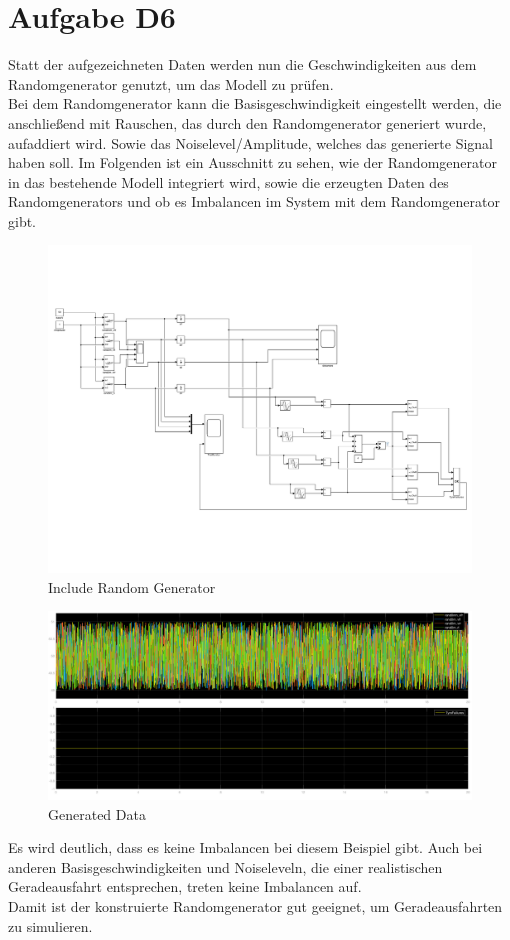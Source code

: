 
\chapter{Aufgabe D6}
Statt der aufgezeichneten Daten werden nun die Geschwindigkeiten aus dem Randomgenerator genutzt, um das Modell zu prüfen. \\
Bei dem Randomgenerator kann die Basisgeschwindigkeit eingestellt werden, die anschließend mit Rauschen, das durch den Randomgenerator generiert wurde, aufaddiert wird. Sowie das Noiselevel/Amplitude, welches das generierte Signal haben soll. Im Folgenden ist ein Ausschnitt zu sehen, wie der Randomgenerator  in das bestehende Modell integriert wird, sowie die erzeugten Daten des Randomgenerators und ob es Imbalancen im System mit dem Randomgenerator gibt.
\begin{figure}[H]
	\centering
	\includegraphics[width=0.95\linewidth]{../Graphiken/TireSimRandom}
	\caption{Include Random Generator}
	\label{fig:randomGeneratorAusschnitt}
\end{figure}
\begin{figure}[H]
	\centering
	\includegraphics[width=0.95\linewidth]{../Graphiken/RandomGeneratorData}
	\caption{Generated Data}
	\label{fig:randomgeneratordata}
\end{figure}
Es wird deutlich, dass es keine Imbalancen bei diesem Beispiel gibt. Auch bei anderen Basisgeschwindigkeiten und Noiseleveln, die einer realistischen Geradeausfahrt entsprechen, treten keine Imbalancen auf.\\
Damit ist der konstruierte Randomgenerator gut geeignet, um Geradeausfahrten zu simulieren.\\

